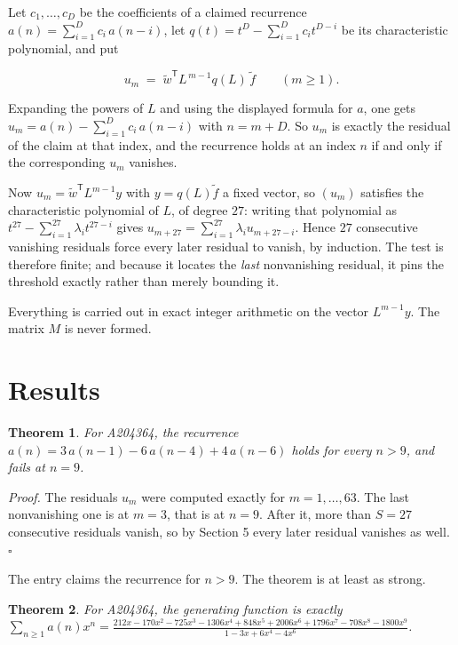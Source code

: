 \documentclass[11pt]{article}
\newtheorem{theorem}{Theorem}
\theoremstyle{definition}
\begin{document}
Let $c_1,\dots,c_D$ be the coefficients of a claimed recurrence $a(n) = \sum_{i=1}^{D} c_i\,a(n-i)$, let $q(t) = t^{D} - \sum_{i=1}^{D} c_i t^{D-i}$ be its characteristic polynomial, and put

\[u_m \;=\; \tilde w^{\mathsf T} L^{\,m-1} q(L)\,\tilde f \qquad (m \ge 1).\]

Expanding the powers of $L$ and using the displayed formula for $a$, one gets $u_m = a(n) - \sum_{i=1}^{D} c_i\,a(n-i)$ with $n = m + D$. So $u_m$ is exactly the residual of the claim at that index, and the recurrence holds at an index $n$ if and only if the corresponding $u_m$ vanishes.

Now $u_m = \tilde w^{\mathsf T} L^{m-1} y$ with $y = q(L)\tilde f$ a fixed vector, so $(u_m)$ satisfies the characteristic polynomial of $L$, of degree $27$: writing that polynomial as $t^{27} - \sum_{i=1}^{27} \lambda_i t^{27-i}$ gives $u_{m+27} = \sum_{i=1}^{27} \lambda_i u_{m+27-i}$. Hence $27$ consecutive vanishing residuals force every later residual to vanish, by induction. The test is therefore finite; and because it locates the {\itshape last} nonvanishing residual, it pins the threshold exactly rather than merely bounding it.

Everything is carried out in exact integer arithmetic on the vector $L^{m-1}y$. The matrix $M$ is never formed.

\section{Results}

\begin{theorem} For A204364, the recurrence $a(n) = 3\,a(n-1) - 6\,a(n-4) + 4\,a(n-6)$ holds for every $n > 9$, and fails at $n = 9$.\end{theorem}

{\itshape Proof.} The residuals $u_m$ were computed exactly for $m = 1,\dots,63$. The last nonvanishing one is at $m = 3$, that is at $n = 9$. After it, more than $S = 27$ consecutive residuals vanish, so by Section 5 every later residual vanishes as well. $\square$

The entry claims the recurrence for $n > 9$. The theorem is at least as strong.

\begin{theorem} For A204364, the generating function is exactly $\sum_{n\ge 1} a(n)x^n = \frac{212x - 170x^{2} - 725x^{3} - 1306x^{4} + 848x^{5} + 2006x^{6} + 1796x^{7} - 708x^{8} - 1800x^{9}}{1 - 3x + 6x^{4} - 4x^{6}}$.\end{theorem}
\end{document}
